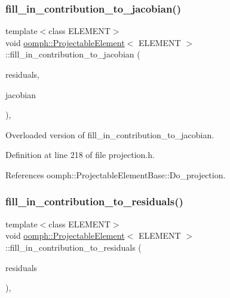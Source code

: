 \subsubsection{\texorpdfstring{fill\+\_\+in\+\_\+contribution\+\_\+to\+\_\+jacobian()}{fill\_in\_contribution\_to\_jacobian()}}
{\footnotesize\ttfamily template$<$class E\+L\+E\+M\+E\+NT$>$ \\
void \hyperlink{classoomph_1_1ProjectableElement}{oomph\+::\+Projectable\+Element}$<$ E\+L\+E\+M\+E\+NT $>$\+::fill\+\_\+in\+\_\+contribution\+\_\+to\+\_\+jacobian (\begin{DoxyParamCaption}\item[{Vector$<$ double $>$ \&}]{residuals,  }\item[{Dense\+Matrix$<$ double $>$ \&}]{jacobian }\end{DoxyParamCaption})\hspace{0.3cm}{\ttfamily [inline]}, {\ttfamily [protected]}}



Overloaded version of fill\+\_\+in\+\_\+contribution\+\_\+to\+\_\+jacobian. 



Definition at line 218 of file projection.\+h.



References oomph\+::\+Projectable\+Element\+Base\+::\+Do\+\_\+projection.

\mbox{\label{classoomph_1_1ProjectableElement_aeb0de899b7a5c7f498b2206ab00ef786}} 
\subsubsection{\texorpdfstring{fill\+\_\+in\+\_\+contribution\+\_\+to\+\_\+residuals()}{fill\_in\_contribution\_to\_residuals()}}
{\footnotesize\ttfamily template$<$class E\+L\+E\+M\+E\+NT$>$ \\
void \hyperlink{classoomph_1_1ProjectableElement}{oomph\+::\+Projectable\+Element}$<$ E\+L\+E\+M\+E\+NT $>$\+::fill\+\_\+in\+\_\+contribution\+\_\+to\+\_\+residuals (\begin{DoxyParamCaption}\item[{Vector$<$ double $>$ \&}]{residuals }\end{DoxyParamCaption})\hspace{0.3cm}{\ttfamily [inline]}, {\ttfamily [protected]}}



